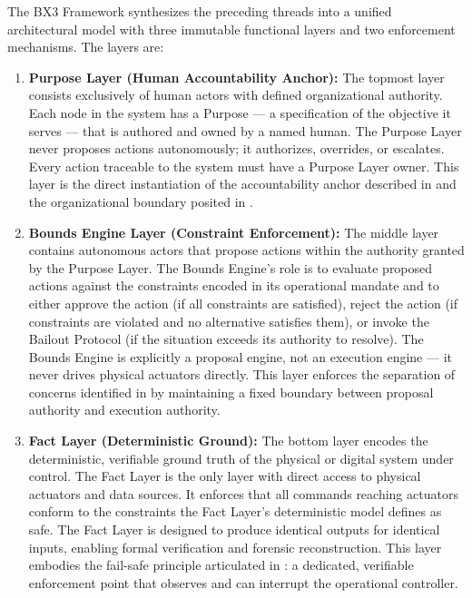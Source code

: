 The BX3 Framework synthesizes the preceding threads into a unified architectural model with three immutable functional layers and two enforcement mechanisms. The layers are:

\begin{enumerate}

\item \textbf{Purpose Layer (Human Accountability Anchor):} The topmost layer consists exclusively of human actors with defined organizational authority. Each node in the system has a Purpose --- a specification of the objective it serves --- that is authored and owned by a named human. The Purpose Layer never proposes actions autonomously; it authorizes, overrides, or escalates. Every action traceable to the system must have a Purpose Layer owner. This layer is the direct instantiation of the accountability anchor described in \cite{wiener1948} and the organizational boundary posited in \cite{trist81}.

\item \textbf{Bounds Engine Layer (Constraint Enforcement):} The middle layer contains autonomous actors that propose actions within the authority granted by the Purpose Layer. The Bounds Engine's role is to evaluate proposed actions against the constraints encoded in its operational mandate and to either approve the action (if all constraints are satisfied), reject the action (if constraints are violated and no alternative satisfies them), or invoke the Bailout Protocol (if the situation exceeds its authority to resolve). The Bounds Engine is explicitly a proposal engine, not an execution engine --- it never drives physical actuators directly. This layer enforces the separation of concerns identified in \cite{dijkstra1982} by maintaining a fixed boundary between proposal authority and execution authority.

\item \textbf{Fact Layer (Deterministic Ground):} The bottom layer encodes the deterministic, verifiable ground truth of the physical or digital system under control. The Fact Layer is the only layer with direct access to physical actuators and data sources. It enforces that all commands reaching actuators conform to the constraints the Fact Layer's deterministic model defines as safe. The Fact Layer is designed to produce identical outputs for identical inputs, enabling formal verification and forensic reconstruction. This layer embodies the fail-safe principle articulated in \cite{bansal2019}: a dedicated, verifiable enforcement point that observes and can interrupt the operational controller.

\end{enumerate}


